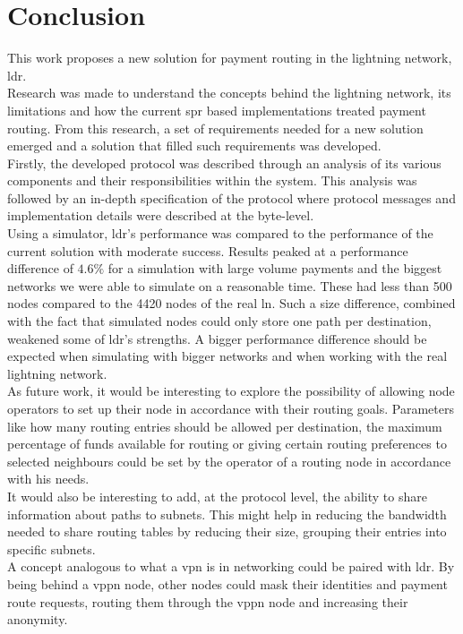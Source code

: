 \section{Conclusion}

This work proposes a new solution for payment routing in the lightning network, \acrfull{ldr}.\\
Research was made to understand the concepts behind the lightning network, its limitations and how the current \acrfull{spr} based implementations treated payment routing. From this research, a set of requirements needed for a new solution emerged and a solution that filled such requirements was developed.\\
Firstly, the developed protocol was described through an analysis of its various components and their responsibilities within the system. This analysis was followed by an in-depth specification of the protocol where protocol messages and implementation details were described at the byte-level.\\
Using a simulator, \acrshort{ldr}'s performance was compared to the performance of the current solution with moderate success. Results peaked at a performance difference of $4.6\%$ for a simulation with large volume payments and the biggest networks we were able to simulate on a reasonable time. These had less than 500 nodes compared to the 4420 nodes of the real \acrshort{ln}. Such a size difference, combined with the fact that simulated nodes could only store one path per destination, weakened some of \acrshort{ldr}'s strengths. A bigger performance difference should be expected when simulating with bigger networks and when working with the real lightning network.\\
As future work, it would be interesting to explore the possibility of allowing node operators to set up their node in accordance with their routing goals. Parameters like how many routing entries should be allowed per destination, the maximum percentage of funds available for routing or giving certain routing preferences to selected neighbours could be set by the operator of a routing node in accordance with his needs.\\
It would also be interesting to add, at the protocol level, the ability to share information about paths to subnets. This might help in reducing the bandwidth needed to share routing tables by reducing their size, grouping their entries into specific subnets.\\
A concept analogous to what a \acrfull{vpn} is in networking could be paired with \acrshort{ldr}. By being behind a \acrfull{vppn} node, other nodes could mask their identities and payment route requests, routing them through the \acrshort{vppn} node and increasing their anonymity.\\
